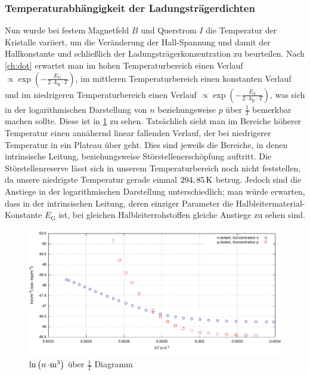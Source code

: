 \documentclass[numbers=noenddot,12pt,a4paper]{scrartcl}
\newcommand{\ix}[1]{_\text{#1}}
\begin{document}
\subsubsection{Temperaturabhängigkeit der Ladungsträgerdichten}
Nun wurde bei festem Magnetfeld $B$ und Querstrom $I$ die Temperatur der Kristalle variiert, um die Veränderung der Hall-Spannung und damit der Hallkonstante und schließlich der Ladungsträgerkonzentration zu beurteilen. Nach \ref{ch:dot} erwartet man im hohen Temperaturbereich einen Verlauf $\propto \exp\left(-\frac{E\ix{G}}{2\cdot k\ix{B}\cdot T} \right)$, im mittleren Temperaturbereich einen konstanten Verlauf und im niedrigeren Temperaturbereich einen Verlauf $\propto \exp\left(-\frac{E\ix{d}}{2\cdot k\ix{B}\cdot T} \right)$, was sich in der logarithmischen Darstellung von $n$ beziehungsweise $p$ über $\frac{1}{T}$ bemerkbar machen sollte. Diese ist in \ref{img:dotierttemperatur} zu sehen. Tatsächlich sieht man im Bereiche höherer Temperatur einen annähernd linear fallenden Verlauf, der bei niedrigerer Temperatur in ein Plateau über geht. Dies sind jeweils die Bereiche, in denen intrinsische Leitung, beziehungsweise Störstellenerschöpfung auftritt. Die Störstellenreserve lässt sich in unserem Temperaturbereich noch nicht feststellen, da unsere niedrigste Temperatur gerade einmal $\unit[294,85]{K}$ betrug. Jedoch sind die Anstiege in der logarithmischen Darstellung unterschiedlich; man würde erwarten, dass in der intrinsischen Leitung, deren einziger Parameter die Halbleitermaterial-Konstante $E\ix{G}$ ist, bei gleichen Halbleiterrohstoffen gleiche Anstiege zu sehen sind.
\begin{figure}[H]
	\includegraphics[width=\textwidth]{messwerte/temperaturkonzentration.pdf}
	\caption{$\ln\left(\unit[n]{\cdot m^3}\right)$ über $\frac{1}{T}$ Diagramm} \label{img:dotierttemperatur}
\end{figure}
\end{document}
